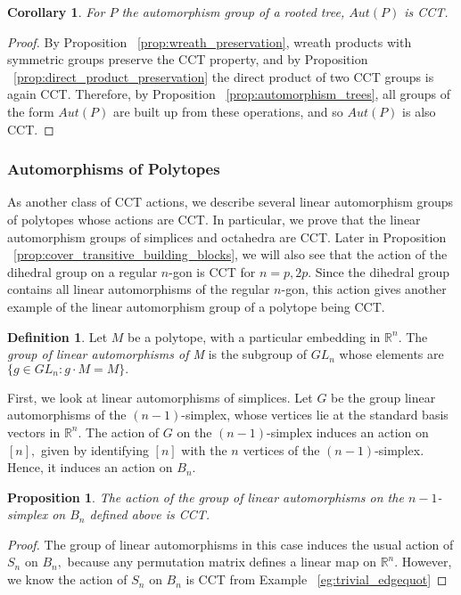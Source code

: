 \documentclass[10 pt]{amsart}
\theoremstyle{plain}
\newtheorem{prop}[thm]{Proposition}
\newtheorem{cor}[thm]{Corollary}
\theoremstyle{definition}
\newtheorem{defn}[thm]{Definition}
\theoremstyle{remark}
\numberwithin{equation}{section}
\newcommand\sssec{\subsubsection}
\newcommand\BR{{\mathbb R}}
\begin{document}
\begin{cor}
For $P$ the automorphism group of a rooted tree, $Aut(P)$ is CCT.
\end{cor}
\begin{proof}
By Proposition ~\ref{prop:wreath_preservation}, wreath products with symmetric groups preserve the CCT property, and by Proposition ~\ref{prop:direct_product_preservation} the direct product of two CCT groups is again CCT. Therefore, by Proposition ~\ref{prop:automorphism_trees}, all groups of the form $Aut(P)$ are built up from these operations, and so $Aut(P)$ is also CCT.
\end{proof}

\sssec{Automorphisms of Polytopes}
\label{sssec:polytopes}

As another class of CCT actions, we describe several linear automorphism groups of polytopes whose actions are CCT. In particular, we prove that the linear automorphism groups of simplices and octahedra are CCT.
Later in Proposition ~\ref{prop:cover_transitive_building_blocks}, we will also see that the action of the dihedral group on a regular $n$-gon is CCT for $n = p,2p$.  Since the dihedral group contains all linear automorphisms of the regular $n$-gon, this action gives another example of the linear automorphism group of a polytope being CCT.

\begin{defn}
Let $M$ be a polytope, with a particular embedding in $\BR^n.$ The {\it group of linear automorphisms of M} is the subgroup of $GL_n$ whose elements are $\{g \in GL_n:g \cdot M = M\}.$
\end{defn}

First, we look at linear automorphisms of simplices. Let $G$ be the group linear automorphisms of the $(n-1)$-simplex, whose vertices lie at the standard basis vectors in $\BR^n.$ The action of $G$ on the $(n-1)$-simplex induces an action on $[n],$ given by identifying $[n]$ with the $n$ vertices of the $(n-1)$-simplex. Hence, it induces an action on $B_n.$

\begin{prop}
The action of the group of linear automorphisms on the $n-1$-simplex on $B_n$ defined above is CCT.
\end{prop}
\begin{proof}
The group of linear automorphisms in this case induces the usual action of $S_n$ on $B_n,$ because any permutation matrix defines a linear map on $\BR^n.$ However, we know the action of $S_n$ on $B_n$ is CCT from Example ~\ref{eg:trivial_edgequot}
\end{proof}
\end{document}

